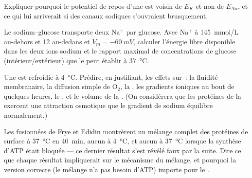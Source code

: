 \begin{exercise}[$\star\star$]\label{exo:b1:membranes-transport:8}
Expliquer pourquoi le potentiel de repos d'une  est voisin de
$E_K$ et non de $E_{Na}$, et ce qui lui arriverait si des canaux
sodiques s'ouvraient brusquement.
\end{exercise}

\begin{exercise}[$\star\star$]\label{exo:b1:membranes-transport:9}
Le  sodium--glucose transporte deux $\mathrm{Na^+}$ par
glucose. Avec $\mathrm{Na^+}$ à \qty{145}{mmol/L} au-dehors et
\qty{12}{} au-dedans et $V_m = \qty{-60}{mV}$, calculer l'énergie libre
disponible dans les deux ions sodium et le rapport maximal de
concentrations de glucose (intérieur/extérieur) que le  peut
établir à \qty{37}{\celsius}.
\end{exercise}

\begin{exercise}[$\star\star\star$]\label{exo:b1:membranes-transport:10}
Une  est refroidie à \qty{4}{\celsius}. Prédire, en justifiant,
les effets sur~: la fluidité membranaire, la diffusion simple de
$\mathrm{O_2}$, la , les gradients ioniques au bout de quelques
heures, le , et le volume de la . (On
considérera que les protéines de la  exercent une attraction
osmotique que le gradient de sodium équilibre normalement.)
\end{exercise}

\begin{exercise}[$\star\star\star$]\label{exo:b1:membranes-transport:11}
Les  fusionnées de Frye et Edidin montrèrent un mélange complet
des protéines de surface à \qty{37}{\celsius} en \qty{40}{min}, aucun à
\qty{4}{\celsius}, et aucun à \qty{37}{\celsius} lorsque la synthèse
d'ATP était bloquée --- ce dernier résultat s'est révélé faux par la
suite. Dire ce que chaque résultat impliquerait sur le mécanisme du
mélange, et pourquoi la version correcte (le mélange n'a pas besoin
d'ATP) importe pour le .
\end{exercise}

